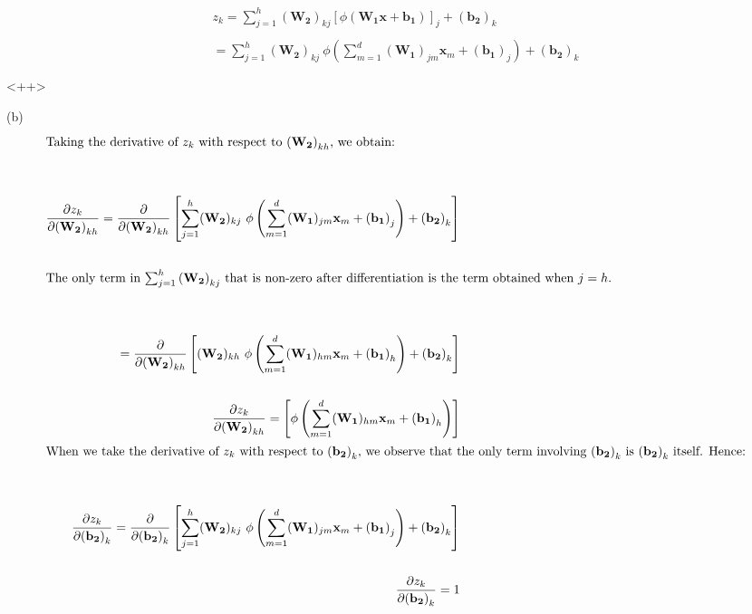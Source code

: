 \documentclass[../main.tex]{subfiles}
\begin{document}
\begin{align*}
    z_k = \sum_{j=1}^{h}(\mathbf{W_2})_{kj} \left[ \phi\left( \mathbf{W_1}\mathbf{x} + \mathbf{b_1} \right) \right]_{j} + \mathbf{(b_2)}_{k} \\
    \\
    = \sum_{j=1}^{h}(\mathbf{W_2})_{kj} \  \phi\left( \sum_{m=1}^{d}(\mathbf{W_1})_{jm}\mathbf{x}_{m} + \mathbf{(b_1)}_{j} \right)  + \mathbf{(b_2)}_{k} \\
    \\
\end{align*}<++>

(b) \\

\begin{align*}
    \intertext{Taking the derivative of $z_k$ with respect to $\mathbf{(W_2)}_{kh}$, we obtain:} \\
    \\
    \frac{\partial z_k}{\partial \mathbf{(W_2)}_{kh}} = \frac{\partial }{\partial \mathbf{(W_2)}_{kh}} \left[\sum_{j=1}^{h}(\mathbf{W_2})_{kj} \  \phi\left( \sum_{m=1}^{d}(\mathbf{W_1})_{jm}\mathbf{x}_{m} + \mathbf{(b_1)}_{j} \right)  + \mathbf{(b_2)}_{k}\right] \\
    \\
    \intertext{The only term in $\sum_{j=1}^{h}\mathbf{(W_2)}_{kj}$ that is non-zero after differentiation is the term obtained when $j = h$.} \\
    \\
    = \frac{\partial }{\partial \mathbf{(W_2)}_{kh}} \left[(\mathbf{W_2})_{kh} \  \phi\left( \sum_{m=1}^{d}(\mathbf{W_1})_{hm}\mathbf{x}_{m} + \mathbf{(b_1)}_{h} \right)  + \mathbf{(b_2)}_{k}\right] \\
    \\
    \frac{\partial z_k}{\partial \mathbf{(W_2)}_{kh}} =  \left[\phi\left( \sum_{m=1}^{d}(\mathbf{W_1})_{hm}\mathbf{x}_{m} + \mathbf{(b_1)}_{h} \right) \right] \\
    \intertext{When we take the derivative of $z_k$ with respect to $\mathbf{(b_2)}_k$, we observe that the only term involving $\mathbf{(b_2)}_k$ is $\mathbf{(b_2)}_k$ itself. Hence:} \\
    \\
    \frac{\partial z_k}{\partial \mathbf{(b_2)}_k} = \frac{\partial }{\partial \mathbf{(b_2)}_k} \left[\sum_{j=1}^{h}(\mathbf{W_2})_{kj} \  \phi\left( \sum_{m=1}^{d}(\mathbf{W_1})_{jm}\mathbf{x}_{m} + \mathbf{(b_1)}_{j} \right)  + \mathbf{(b_2)}_{k}\right] \\
    \\
    \frac{\partial z_k}{\partial \mathbf{(b_2)}_k} = 1
    \\
\end{align*}
\end{document}
